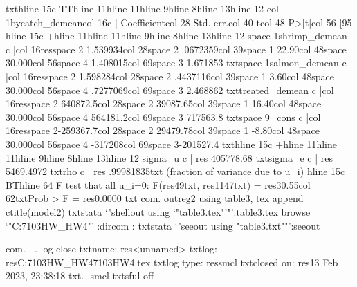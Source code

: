 {txt}{hline 15}{c TT}{hline 11}{hline 11}{hline 9}{hline 8}{hline 13}{hline 12}
{col 1}bycatch_demean{col 16}{c |} Coefficient{col 28}  Std. err.{col 40}      t{col 48}   P>|t|{col 56}     [95%
{hline 15}{c +}{hline 11}{hline 11}{hline 9}{hline 8}{hline 13}{hline 12}
{space 1}shrimp_demean {c |}{col 16}{res}{space 2} 1.539934{col 28}{space 2} .0672359{col 39}{space 1}   22.90{col 48}{space 3}0.000{col 56}{space 4} 1.408015{col 69}{space 3} 1.671853
{txt}{space 1}salmon_demean {c |}{col 16}{res}{space 2} 1.598284{col 28}{space 2} .4437116{col 39}{space 1}    3.60{col 48}{space 3}0.000{col 56}{space 4} .7277069{col 69}{space 3} 2.468862
{txt}treated_demean {c |}{col 16}{res}{space 2} 640872.5{col 28}{space 2} 39087.65{col 39}{space 1}   16.40{col 48}{space 3}0.000{col 56}{space 4} 564181.2{col 69}{space 3} 717563.8
{txt}{space 9}_cons {c |}{col 16}{res}{space 2}-259367.7{col 28}{space 2} 29479.78{col 39}{space 1}   -8.80{col 48}{space 3}0.000{col 56}{space 4}  -317208{col 69}{space 3}-201527.4
{txt}{hline 15}{c +}{hline 11}{hline 11}{hline 9}{hline 8}{hline 13}{hline 12}
       sigma_u {c |} {res} 405778.68
       {txt}sigma_e {c |} {res} 5469.4972
           {txt}rho {c |} {res} .99981835{txt}   (fraction of variance due to u_i)
{hline 15}{c BT}{hline 64}
F test that all u_i=0: F({res}49{txt}, {res}1147{txt}) = {res}30.55{col 62}{txt}Prob > F = {res}0.0000
{txt}
{com}. outreg2 using table3, tex append ctitle(model2)
{txt}{stata `"shellout using `"table3.tex"'"':table3.tex}
{browse `"C:\Users\sedat\OneDrive{}\ECON7103HW_HW4"' :dir}{com} : {txt}{stata `"seeout using "table3.txt""':seeout}

{com}. 
. 
. log close
      {txt}name:  {res}<unnamed>
       {txt}log:  {res}C:\Users\sedat\OneDrive{}\ECON7103HW_HW4\Econ7103HW4.tex
  {txt}log type:  {res}smcl
 {txt}closed on:  {res}13 Feb 2023, 23:38:18
{txt}{.-}
{smcl}
{txt}{sf}{ul off}